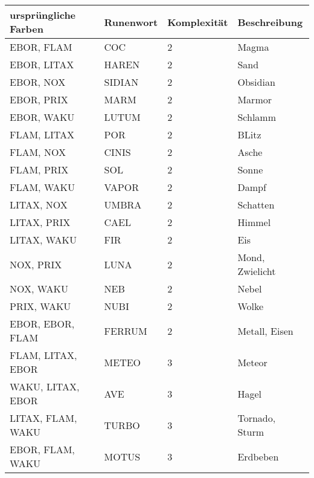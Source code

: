\documentclass{article}
\begin{document}
\begin{small}
\begin{tabular}{|m{4cm}|m{3cm}|m{3cm}|m{3cm}|}
\hline
\textbf{ursprüngliche Farben}&\textbf{Runenwort}&\textbf{Komplexität}&\textbf{Beschreibung}\\
\hline
\hline
EBOR, FLAM&COC&2&Magma\\
\hline
EBOR, LITAX&HAREN&2&Sand\\
\hline
EBOR, NOX&SIDIAN&2&Obsidian\\
\hline
EBOR, PRIX&MARM&2&Marmor\\
\hline
EBOR, WAKU&LUTUM&2&Schlamm\\
\hline
FLAM, LITAX&POR&2&BLitz\\
\hline
FLAM, NOX&CINIS&2&Asche\\
\hline
FLAM, PRIX&SOL&2&Sonne\\
\hline
FLAM, WAKU&VAPOR&2&Dampf\\
\hline
LITAX, NOX&UMBRA&2&Schatten\\
\hline
LITAX, PRIX&CAEL&2&Himmel\\
\hline
LITAX, WAKU&FIR&2&Eis\\
\hline
NOX, PRIX&LUNA&2&Mond, Zwielicht\\
\hline
NOX, WAKU&NEB&2&Nebel\\
\hline
PRIX, WAKU&NUBI&2&Wolke\\
\hline
EBOR, EBOR, FLAM&FERRUM&2&Metall, Eisen\\
\hline
FLAM, LITAX, EBOR&METEO&3&Meteor\\
\hline
WAKU, LITAX, EBOR&AVE&3&Hagel\\
\hline
LITAX, FLAM, WAKU&TURBO&3&Tornado, Sturm\\
\hline
EBOR, FLAM, WAKU&MOTUS&3&Erdbeben\\
\hline
\end{tabular}
\end{small}
\end{document}
